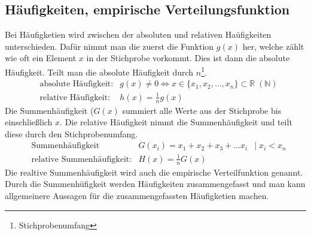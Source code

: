\documentclass[a4paper]{scrartcl}
\begin{document}
        \subsection{Häufigkeiten, empirische Verteilungsfunktion}
            Bei Häufigketien wird zwischen der absoluten und relativen Haüfigkeiten unterschieden. Dafür nimmt man die zuerst die Funktion \(g(x)\) her, welche zählt wie oft
            ein Element \(x\) in der Stichprobe vorkommt. Dies ist dann die absolute Häufigkeit. Teilt man die absolute Häufigkeit durch \(n\)\footnote{Stichprobenumfang}.
            \begin{equation*}
                \begin{aligned}
                    & \text{absolute Häufigkeit:} & g(x) \neq 0 \Leftrightarrow x \in \{ x_1,x_2,..., x_n\} \subset \mathbb{R} \; (\mathbb{N}) \\
                    & \text{relative Häufigkeit:} & h(x) = \frac{1}{n} g(x) 
                \end{aligned}
            \end{equation*}    
            Die Summenhäufigkeit (\(G(x)\) summiert alle Werte aus der Stichprobe bis einschließlich \(x\). Die relative Häufigkeit nimmt die Summenhäufigkeit und teilt
            diese durch den Stichprobenumfang.
            \begin{equation*}
                \begin{aligned}
                    & \text{Summenhäufigkeit} & G(x_i) = x_1 + x_2 + x_3 + \ldots x_i & | \; x_i < x_n  \\
                    & \text{relative Summenhäufigkeit:} & H(x) = \frac{1}{n} G(x) &  
                \end{aligned}
            \end{equation*}  
            Die realtive Summenhäufigkeit wird auch die empirische Verteilfunktion genannt. Durch die Summenhüfigkeit werden Häufigkeiten zusammengefasst und man kann
            allgemeinere Aussagen für die zusammengefassten Häufigketien machen.
\end{document}

